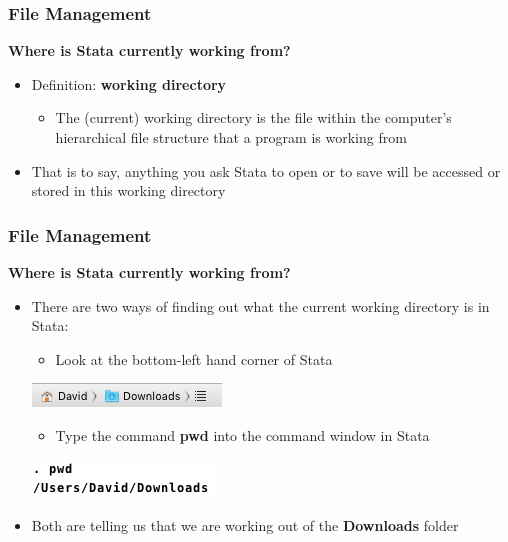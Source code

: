 \documentclass[10pt, compress]{beamer}
\begin{document}
\begin{frame}[fragile]
\frametitle{File Management}
\begin{center}
	\textbf{Where is Stata currently working from?}
\end{center}
\begin{itemize}
\item \alert{Definition}: \textbf{working directory}
\begin{itemize}
\item The (\alert{current}) working directory is the file within the computer's hierarchical file structure that a program is working from
\end{itemize}
\item That is to say, anything you ask Stata to open or to save will be accessed or stored in this working directory
\end{itemize}
\end{frame}

\begin{frame}[fragile]
\frametitle{File Management}
\begin{center}
	\textbf{Where is Stata currently working from?}
\end{center}
\begin{itemize}
\item There are two ways of finding out what the current working directory is in Stata:
\begin{itemize}
\item Look at the bottom-left hand corner of Stata
\end{itemize}
\smallskip
\begin{center}
\includegraphics{pwd1.png}
\end{center}
\begin{itemize}
\item Type the command \textbf{pwd} into the command window in Stata
\end{itemize}
\begin{center}
\includegraphics{pwd2.png}
\end{center}
\item Both are telling us that we are working out of the \textbf{Downloads} folder
\end{itemize}
\end{frame}
\end{document}
